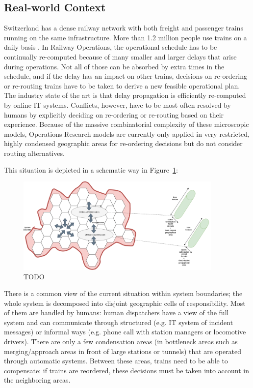 \documentclass{article}
\begin{document}
\subsection{Real-world Context}
Switzerland has a dense railway network with both freight and passenger trains running on the same infrastructure. More than 1.2 million people use trains on a daily basis \cite{rcsbrochure}.
In Railway Operations, the operational schedule has to be continually re-computed because of many smaller and larger delays that arise during operations. Not all of those can be absorbed by extra times in the schedule, and if the delay has an impact on other trains, decisions on re-ordering or re-routing trains have to be taken to derive a new feasible operational plan. The industry state of the art is that delay propagation is efficiently re-computed by online IT systems. Conflicts, however, have to be most often resolved by humans by explicitly deciding on re-ordering or re-routing based on their experience. Because of the massive combinatorial complexity of these microscopic models, Operations Research models are currently only applied in very restricted, highly condensed geographic areas for re-ordering decisions but do not consider routing alternatives.



This situation is depicted in a schematic way in Figure~\ref{fig:introduction_compensation}:
%
\begin{figure}[hbtp]
	\centering
  \includegraphics[width=0.9\textwidth]{introduction_compensation.png}
	\caption{TODO}
	\label{fig:introduction_compensation}
\end{figure}
%
There is a common view of the current situation within system boundaries; the whole system is decomposed into disjoint geographic cells of responsibility. Most of them are handled by humans: human dispatchers have a view of the full system and can communicate through structured (e.g. IT system of incident messages) or informal ways (e.g. phone call with station managers or locomotive drivers). There are only a few condensation areas \cite{caimi2009} (in bottleneck areas such as merging/approach areas in front of large stations or tunnels) that are operated through automatic systems. Between these areas, trains need to be able to compensate: if trains are reordered, these decisions must be taken into account in the neighboring areas.
\end{document}
